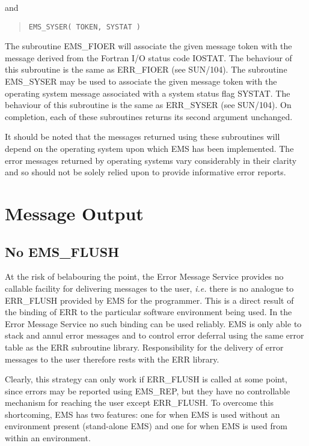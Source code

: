 and

\begin {quote}
\begin{verbatim}
EMS_SYSER( TOKEN, SYSTAT )
\end{verbatim}
\end {quote}

The subroutine EMS\_FIOER will associate the given message token with the 
message derived from the Fortran I/O status code IOSTAT.
The behaviour of this subroutine is the same as ERR\_FIOER (see SUN/104).
The subroutine EMS\_SYSER may be used to associate the given message token
with the operating system message associated with a system status flag SYSTAT.
The behaviour of this subroutine is the same as ERR\_SYSER (see SUN/104).
On completion, each of these subroutines returns its second argument
unchanged. 

It should be noted that the messages returned using these subroutines 
will depend on the operating system upon which EMS has been implemented. 
The error messages returned by operating systems vary considerably in their
clarity and so should not be solely relied upon to provide informative error 
reports.


\section {Message Output}

\subsection {No EMS\_FLUSH}

At the risk of belabouring the point, the Error Message Service provides no 
callable facility for delivering messages to the user, {\em i.e.} there is 
no analogue to ERR\_FLUSH provided by EMS for the programmer.
This is a direct result of the binding of ERR to the particular 
software environment being used.
In the Error Message Service no such binding can be used reliably.
EMS is only able to stack and annul error messages and to
control error deferral using the same error table as the ERR subroutine
library. 
Responsibility for the delivery of error messages to the user therefore rests
with the ERR library.

Clearly, this strategy can only work if ERR\_FLUSH is called at some point, 
since errors may be reported using EMS\_REP, but they have no controllable 
mechanism for reaching the user except ERR\_FLUSH.
To overcome this shortcoming, EMS has two features: one for when 
EMS is used without an environment present (stand-alone EMS) and one for when
EMS is used from within an environment.


